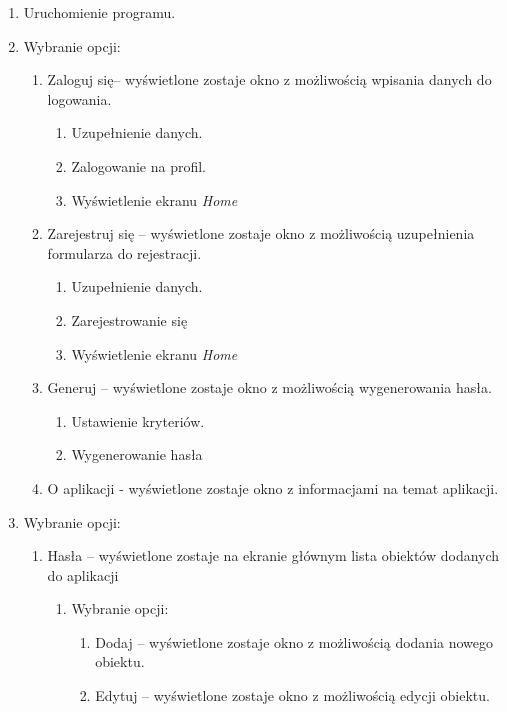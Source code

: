 \documentclass[a4paper]{article}
\begin{document}
\begin{enumerate}
    \item Uruchomienie programu.
    \item Wybranie opcji:\label{eGłówny}
    \begin{enumerate}
        \item Zaloguj się-- wyświetlone zostaje okno z możliwością wpisania danych do logowania.
        \begin{enumerate}
            \item Uzupełnienie danych.
            \item Zalogowanie na profil.
            \item Wyświetlenie ekranu \textit{Home}
        \end{enumerate}
        \item Zarejestruj się -- wyświetlone zostaje okno z możliwością uzupełnienia formularza do rejestracji.
        \begin{enumerate}
            \item Uzupełnienie danych.
            \item Zarejestrowanie się
            \item Wyświetlenie ekranu \textit{Home}
        \end{enumerate}
        \item Generuj -- wyświetlone zostaje okno z możliwością wygenerowania hasła.\label{gen}
        \begin{enumerate}
            \item Ustawienie kryteriów.
            \item Wygenerowanie hasła
        \end{enumerate}
        \item O aplikacji - wyświetlone zostaje okno z informacjami na temat aplikacji.
    \end{enumerate}
    \item Wybranie opcji:
    \begin{enumerate}
        \item Hasła -- wyświetlone zostaje na ekranie głównym lista  obiektów dodanych do aplikacji
        \begin{enumerate}
            \item Wybranie opcji:
            \begin{enumerate}
                \item Dodaj -- wyświetlone zostaje okno z możliwością dodania nowego obiektu.
                \item Edytuj -- wyświetlone zostaje okno z możliwością edycji obiektu.

\end{enumerate}
\end{enumerate}
\end{enumerate}
\end{enumerate}
\end{document}
